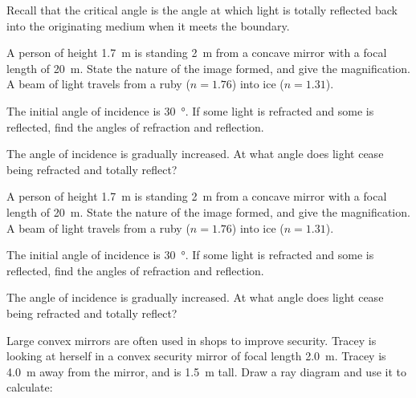 \documentclass[a4paper]{exam}
\begin{document}
\begin{questions}
    \question Recall that the critical angle is the angle at which light is totally reflected back into the originating
              medium when it meets the boundary.
    \question A person of height \SI{1.7}{\metre} is standing \SI{2}{\metre} from a concave mirror with a focal length of \SI{20}{\metre}.
              State the nature of the image formed, and give the magnification.
    \question A beam of light travels from a ruby ($ n = 1.76 $) into ice ($ n = 1.31 $).
      \begin{parts}
        \item The initial angle of incidence is \SI{30}{\degree}. If some light is refracted and some is
              reflected, find the angles of refraction and reflection.
        \item The angle of incidence is gradually increased. At what angle does light cease being refracted and totally reflect?
      \end{parts}
    \question A person of height \SI{1.7}{\metre} is standing \SI{2}{\metre} from a concave mirror with a focal length of \SI{20}{\metre}.
              State the nature of the image formed, and give the magnification.
    \question A beam of light travels from a ruby ($ n = 1.76 $) into ice ($ n = 1.31 $).
      \begin{parts}
        \item The initial angle of incidence is \SI{30}{\degree}. If some light is refracted and some is
              reflected, find the angles of refraction and reflection.
        \item The angle of incidence is gradually increased. At what angle does light cease being refracted and totally reflect?
      \end{parts}
    \question Large convex mirrors are often used in shops to improve security. Tracey
              is looking at herself in a convex security mirror of focal length \SI{2.0}{\metre}.
              Tracey is \SI{4.0}{\metre} away from the mirror, and is \SI{1.5}{\metre} tall.
              Draw a ray diagram and use it to calculate:
      \begin{parts}

\end{parts}
\end{questions}
\end{document}
